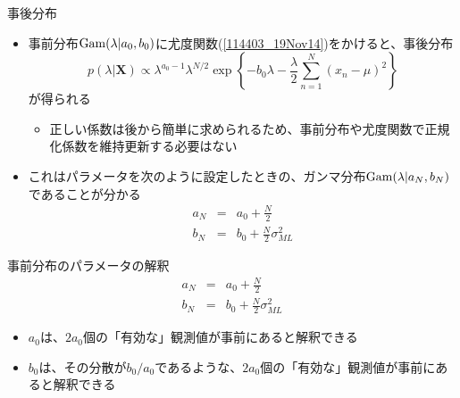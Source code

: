 \begin{frame}{事後分布}
 \begin{itemize}
  \item 事前分布${\rm Gam}(\lambda|a_0,b_0)$に尤度関数(\ref{114403_19Nov14})をかけると、事後分布
        \begin{equation}
         p(\lambda|\bm{X}) \propto \lambda^{a_0-1}\lambda^{N/2}\exp\left\{-b_0\lambda-\frac{\lambda}{2}\sum_{n=1}^{N}(x_n-\mu)^2\right\}\label{114734_19Nov14}
        \end{equation}
        が得られる
        \begin{itemize}
         \item 正しい係数は後から簡単に求められるため、事前分布や尤度関数で正規化係数を維持更新する必要はない
        \end{itemize}
  \item これはパラメータを次のように設定したときの、ガンマ分布${\rm Gam}(\lambda|a_N,b_N)$であることが分かる
        \begin{eqnarray}
         a_N&=& a_0 + \frac{N}{2}\\
         b_N%
         &= & b_0+\frac{N}{2}\sigma^2_{ML}
        \end{eqnarray}
 \end{itemize}
\end{frame}

\begin{frame}{事前分布のパラメータの解釈}
 \begin{eqnarray*}
  a_N&=& a_0 + \frac{N}{2}\\
  b_N%
  &= & b_0+\frac{N}{2}\sigma^2_{ML}
 \end{eqnarray*}
 \begin{itemize}
  \item $a_0$は、$2a_0$個の「有効な」観測値が事前にあると解釈できる
  \item $b_0$は、その分散が$b_0/a_0$であるような、$2a_0$個の「有効な」観測値が事前にあると解釈できる
 \end{itemize}
\end{frame}

